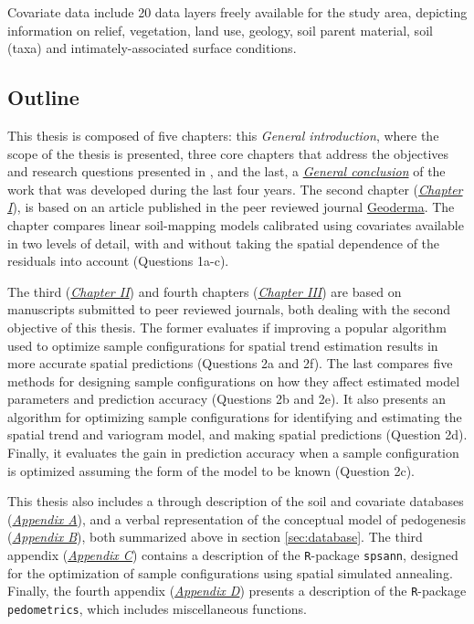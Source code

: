Covariate data include 20 data layers freely available for the study area, 
depicting information on relief, vegetation, land use, geology, soil parent material, soil (taxa) 
and intimately-associated surface conditions.




\subsection{Outline}

This thesis is composed of five chapters: this \textit{General introduction}, where the scope of the
thesis is presented, three core chapters that address the objectives and research questions presented
in , and the last, a \hyperref[chap:conclusion]{\textit{General conclusion}}
of the work that was developed during the last four years. The second chapter (\hyperref[chap:chapter01]{\textit{Chapter
I}}), is based on an article published in the peer reviewed journal 
\href{http://www.journals.elsevier.com/geoderma/}{Geoderma}. The chapter compares linear soil-mapping
 models calibrated using covariates available in two levels of detail, with and without taking the 
spatial dependence of the residuals into account (Questions 1a-c).

The third (\hyperref[chap:chapter02]{\textit{Chapter II}}) and fourth chapters 
(\hyperref[chap:chapter03]{\textit{Chapter III}}) are based on manuscripts submitted to peer 
reviewed journals, both dealing with the second objective of this thesis. The 
former evaluates if improving a popular algorithm used to optimize sample configurations for spatial
trend estimation results in more accurate spatial predictions (Questions 2a and 2f). The last 
compares five methods for designing sample configurations on how they affect estimated model 
parameters and prediction accuracy (Questions 2b and 2e). It also presents an algorithm for 
optimizing sample configurations for identifying and estimating the spatial trend and variogram 
model, and making spatial predictions (Question 2d). Finally, it evaluates the gain in prediction 
accuracy when a sample configuration is optimized assuming the form of the model to be known 
(Question 2c).

This thesis also includes a through description of the soil and covariate databases
(\hyperref[apen:database]{\textit{Appendix A}}), and a verbal representation of the conceptual model
of pedogenesis (\hyperref[apen:pedogenesis]{\textit{Appendix B}}), both summarized above in section
\ref{sec:database}. The third appendix (\hyperref[apen:spsann]{\textit{Appendix C}})  contains a 
description of the \texttt{R}-package \texttt{spsann}, designed for the optimization of sample 
configurations using spatial simulated annealing. Finally, the fourth appendix 
(\hyperref[apen:pedometrics]{\textit{Appendix D}}) presents a description of the \texttt{R}-package
 \texttt{pedometrics}, which includes miscellaneous functions.

